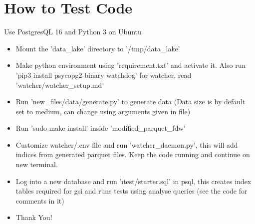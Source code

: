 \documentclass[11pt, a4paper]{article}
\begin{document}
\section{How to Test Code}
Use PostgresQL 16 and Python 3 on Ubuntu
\begin{itemize}
    \item Mount the 'data\_lake' directory to '/tmp/data\_lake'
    \item Make python environment using 'requirement.txt' and activate it. Also run 'pip3 install psycopg2-binary watchdog' for watcher, read 'watcher/watcher\_setup.md'
    \item Run 'new\_files/data/generate.py' to generate data (Data size is by default set to medium, can change using arguments given in file)
    \item Run 'sudo make install' inside 'modified\_parquet\_fdw'
    \item Customize watcher/.env file and run 'watcher\_daemon.py', this will add indices from generated parquet files. Keep the code running and continue on new terminal.
    \item Log into a new database and run '\i test/starter.sql' in psql, this creates index tables required for gsi and runs tests using analyse queries (see the code for comments in it)
    \item Thank You!
    
\end{itemize}
\end{document}

